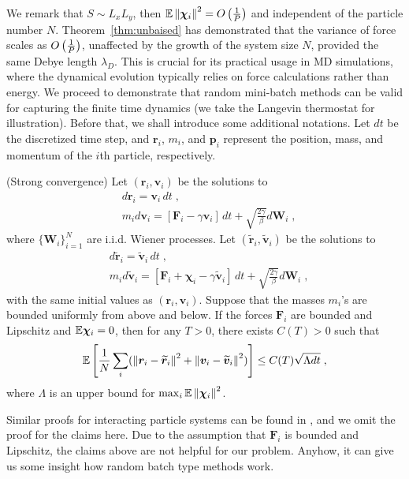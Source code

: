 We remark that $S \sim L_xL_y$, then $	\mathbb{E}\left\lVert\boldsymbol{\chi}_{i}\right\rVert^2=O\left(\frac{1}{P}\right)$ and independent of the particle number $N$.
Theorem~\ref{thm:unbaised} has demonstrated that the variance of force scales as $O\left(\frac{1}{P}\right)$, unaffected by the growth of the system size $N$, provided the same   Debye length $\lambda_{D}$. 
This is crucial for its practical usage in MD simulations, where the dynamical evolution typically relies on force calculations rather than energy. 
We proceed to demonstrate  
that random mini-batch methods can be valid for capturing the finite time dynamics
(we take the Langevin thermostat for illustration). Before that, we shall introduce  some additional notations.
Let $d t$ be the discretized time step, and $\bm{r}_i$, $m_i$, and $\bm{p}_i$ represent the position, mass, and momentum of the $i$th particle, respectively. 
\begin{thm}(Strong convergence)
Let $(\bm{r}_i, \bm{v}_i)$ be the solutions to
\[
\begin{split}
&d\bm{r}_i=\bm{v}_i\,d t\;,\\
&m_i d\bm{v}_i=\left[\bm{F}_i-\gamma \bm{v}_i\right]\,d t+\sqrt{\frac{2\gamma}{\beta}}d \bm{W}_i\;,
\end{split}
\]
where $\{\bm{W}_i\}_{i=1}^N$ are i.i.d. Wiener processes. Let $(\widetilde{\bm{r}}_i, \widetilde{\bm{v}}_i)$ be the solutions to
\[
\begin{split}
&d \widetilde{\bm{r}}_i=\widetilde{\bm{v}}_i\,d t\;,\\
&m_i d\widetilde{\bm{v}}_i=\left[\bm{F}_i +\bm{\chi}_i-\gamma \widetilde{\bm{v}}_i\right]\,d t+\sqrt{\frac{2\gamma}{\beta}}d \bm{W}_i\;,
\end{split}
\]
with the same initial values as $(\bm{r}_i, \bm{v}_i)$. Suppose that the masses $m_i$'s are bounded uniformly from above and below.
If the forces $\bm{F}_i$ are bounded and Lipschitz and $\mathbb{E} \bm{\chi}_i=0$, then for any $T>0$, there exists $C(T)>0$ such that
\[
\mathbb{E}\left[\frac{1}{N}\sum_i (\left\lVert\bm{r}_i-\widetilde{\bm{r}}_i\right\rVert^2
+\left\lVert\bm{v}_i-\widetilde{\bm{v}}_i\right\rVert^2) \right] \leq C(T)\sqrt{\Lambda dt}\;,
\]
where $\Lambda$ is an upper bound for $\max_i  \mathbb{E}\left\lVert\bm{\chi}_i\right\rVert^2$.
\end{thm}
Similar proofs for interacting particle systems can be found in \cite{jin2020convergence,li2019stochastic,li2020random}, and we omit the proof for the claims here.  Due to the assumption that $\bm{F}_i$ is bounded and Lipschitz, the claims above are not helpful for our problem. Anyhow, it can give us some insight how random batch type methods work.

